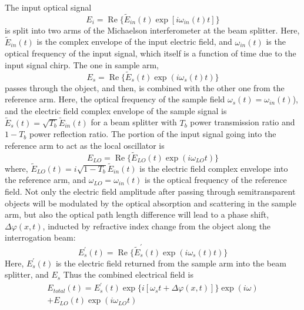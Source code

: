 \documentclass[aps,pra,reprint,superscriptaddress]{revtex4-1}
\begin{document}
The input optical signal 
\begin{equation}
E_i = \operatorname{Re} \lbrace \tilde{E}_{in}(t) \exp[i \omega_{in}(t) t] \rbrace
\end{equation}
is split into two arms of the Michaelson interferometer at the beam splitter. Here, $\tilde{E}_{in}(t)$ is the complex envelope of the input electric field, and $\omega_{in}(t)$ is the optical frequency of the input signal, which itself is a function of time due to the input signal chirp. The one in sample arm, 
\begin{equation}
E_s = \operatorname{Re} \lbrace \tilde{E}_s(t) \exp(i\omega_s(t) t) \rbrace
\end{equation}
passes through the object, and then, is combined with the other one from the reference arm. Here, the optical frequency of the sample field $\omega_s(t) = \omega_{in}(t)$), and the electric field complex envelope of the sample signal is $\tilde{E}_s(t) = \sqrt{T_b} \tilde{E}_{in}(t)$ for a beam splitter with $T_b$ power transmission ratio and $1 - T_b$ power reflection ratio. The portion of the input signal going into the reference arm to act as the local oscillator is
\begin{equation}
E_{LO} = \operatorname{Re} \lbrace \tilde{E}_{LO}(t) \exp(i\omega_{LO} t) \rbrace
\end{equation}
where, $\tilde{E}_{LO}(t) = i\sqrt{1 - T_b} \tilde{E}_{in}(t)$ is the electric field complex envelope into the reference arm, and $\omega_{LO} = \omega_{in}(t)$ is the optical frequency of the reference field. Not only the electric field amplitude after passing through semitransparent objects will be modulated by the optical absorption and scattering in the sample arm, but also the optical path length difference will lead to a phase shift, $\Delta\varphi(x,t)$, inducted by refractive index change from the object along the interrogation beam:
\begin{equation}
E_s^\prime(t) = \operatorname{Re} \lbrace \tilde{E}_s^\prime(t) \exp(i\omega_s(t) t) \rbrace
\end{equation}
Here, $E_s^\prime(t)$ is the electric field returned from the sample arm into the beam splitter, and $E_s$
Thus the combined electrical field is
\begin{multline}\label{eq:totalElecField}
E_{total}(t) = E_s^\prime(t) \exp \lbrace i[\omega_s t+\Delta\varphi(x,t)] \rbrace \exp(i \omega )\\
+ E_{LO}(t) \exp(i\omega_{LO} t)
\end{multline}
\end{document}
